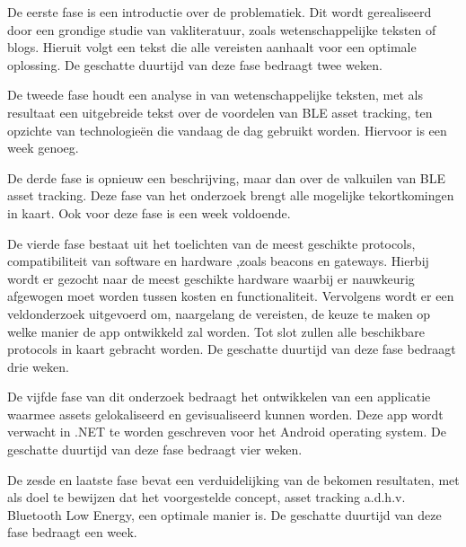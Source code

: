 De eerste fase is een introductie over de problematiek. Dit wordt gerealiseerd door een grondige studie van vakliteratuur, zoals wetenschappelijke teksten of blogs. Hieruit volgt een tekst die alle vereisten aanhaalt voor een optimale oplossing. De geschatte duurtijd van deze fase bedraagt twee weken.

De tweede fase houdt een analyse in van wetenschappelijke teksten, met als resultaat een uitgebreide tekst over de voordelen van BLE asset tracking, ten opzichte van technologieën die vandaag de dag gebruikt worden. Hiervoor is een week genoeg.

De derde fase is opnieuw een beschrijving, maar dan over de valkuilen van BLE asset tracking. Deze fase van het onderzoek brengt alle mogelijke tekortkomingen in kaart. Ook voor deze fase is een week voldoende.

De vierde fase bestaat uit het toelichten van de meest geschikte protocols, compatibiliteit van software en hardware ,zoals beacons en gateways. Hierbij wordt er gezocht naar de meest geschikte hardware waarbij er nauwkeurig afgewogen moet worden tussen kosten en functionaliteit. Vervolgens wordt er een veldonderzoek uitgevoerd om, naargelang de vereisten, de keuze te maken op welke manier de app ontwikkeld zal worden. Tot slot zullen alle beschikbare protocols in kaart gebracht worden. De geschatte duurtijd van deze fase bedraagt drie weken.

De vijfde fase van dit onderzoek bedraagt het ontwikkelen van een applicatie waarmee assets gelokaliseerd en gevisualiseerd kunnen worden. Deze app wordt verwacht in .NET te worden geschreven voor het Android operating system. De geschatte duurtijd van deze fase bedraagt vier weken.

De zesde en laatste fase bevat een verduidelijking van de bekomen resultaten, met als doel te bewijzen dat het voorgestelde concept, asset tracking a.d.h.v. Bluetooth Low Energy, een optimale manier is. De geschatte duurtijd van deze fase bedraagt een week.


